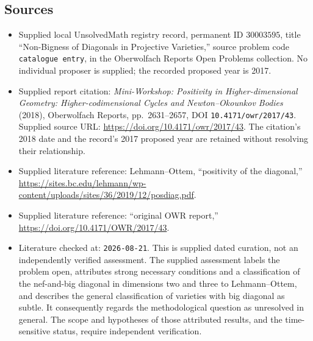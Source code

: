 \documentclass[11pt]{article}
\begin{document}
\subsection{Sources}
\begin{itemize}
\item Supplied local UnsolvedMath registry record, permanent ID \(30003595\), title ``Non-Bigness of Diagonals in Projective Varieties,'' source problem code \texttt{catalogue entry}, in the Oberwolfach Reports Open Problems collection. No individual proposer is supplied; the recorded proposed year is 2017.
\item Supplied report citation: \emph{Mini-Workshop: Positivity in Higher-dimensional Geometry: Higher-codimensional Cycles and Newton--Okounkov Bodies} (2018), Oberwolfach Reports, pp.~2631--2657, DOI \texttt{10.4171/owr/2017/43}. Supplied source URL: \url{https://doi.org/10.4171/owr/2017/43}. The citation's 2018 date and the record's 2017 proposed year are retained without resolving their relationship.
\item Supplied literature reference: Lehmann--Ottem, ``positivity of the diagonal,'' \url{https://sites.bc.edu/lehmann/wp-content/uploads/sites/36/2019/12/posdiag.pdf}.
\item Supplied literature reference: ``original OWR report,'' \url{https://doi.org/10.4171/OWR/2017/43}.
\item Literature checked at: \texttt{2026-08-21}. This is supplied dated curation, not an independently verified assessment. The supplied assessment labels the problem open, attributes strong necessary conditions and a classification of the nef-and-big diagonal in dimensions two and three to Lehmann--Ottem, and describes the general classification of varieties with big diagonal as subtle. It consequently regards the methodological question as unresolved in general. The scope and hypotheses of those attributed results, and the time-sensitive status, require independent verification.
\end{itemize}
\end{document}
